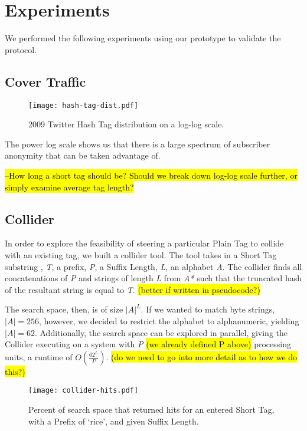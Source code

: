 \section{Experiments}

We performed the following experiments using our prototype to validate the protocol.

\subsection{Cover Traffic}

\begin{figure}
\begin{center}
\texttt{[image: hash-tag-dist.pdf]}
\caption{2009 Twitter Hash Tag distribution on a log-log scale.
\label{fig:hash-dist}
}
\end{center}
\end{figure}

The power log scale shows us that there is a large spectrum of subscriber anonymity that can be taken advantage of. 

\hl{--How long a short tag should be? Should we break down log-log scale further, or simply examine average tag length?}


\subsection{Collider}

In order to explore the feasibility of steering a particular Plain Tag to collide with an existing tag, we built a collider tool. The tool takes in a Short Tag substring , \textit{T}, a prefix, \textit{P}, a Suffix Length, \textit{L}, an alphabet 
\textit{A}. The collider finds all concatenations of \textit{P} and strings of length \textit{L} from \textit{A*} such that the truncated hash of the resultant string is equal to \textit{T}. \hl{(better if written in pseudocode?)}

The search space, then, is of size $|A|^L$. If we wanted to match byte strings, $|A| = 256$, however, we decided to restrict the alphabet to alphanumeric, yielding $|A| = 62$. Additionally, the search space can be explored in parallel, giving the Collider executing on a system with \textit{P} \hl{(we already defined P above)} processing units, a runtime of $O(\frac{62^L}{P})$. \hl{(do we need to go into more detail as to how we do this?)}

\begin{figure}
\begin{center}
\texttt{[image: collider-hits.pdf]}
\caption{Percent of search space that returned hits for an entered Short Tag, with a Prefix of `rice', and given Suffix Length.
\label{fig:collider-hits}
}
\end{center}
\end{figure}

